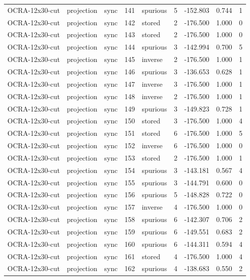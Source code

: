 \begin{tabular}{lllrlrrrr}
OCRA-12x30-cut & projection & sync & 141 & spurious & 5 & -152.803 & 0.744 & 1 \\
OCRA-12x30-cut & projection & sync & 142 & stored & 2 & -176.500 & 1.000 & 0 \\
OCRA-12x30-cut & projection & sync & 143 & stored & 2 & -176.500 & 1.000 & 0 \\
OCRA-12x30-cut & projection & sync & 144 & spurious & 3 & -142.994 & 0.700 & 5 \\
OCRA-12x30-cut & projection & sync & 145 & inverse & 2 & -176.500 & 1.000 & 1 \\
OCRA-12x30-cut & projection & sync & 146 & spurious & 3 & -136.653 & 0.628 & 1 \\
OCRA-12x30-cut & projection & sync & 147 & inverse & 3 & -176.500 & 1.000 & 1 \\
OCRA-12x30-cut & projection & sync & 148 & inverse & 2 & -176.500 & 1.000 & 1 \\
OCRA-12x30-cut & projection & sync & 149 & spurious & 3 & -149.823 & 0.728 & 1 \\
OCRA-12x30-cut & projection & sync & 150 & stored & 3 & -176.500 & 1.000 & 4 \\
OCRA-12x30-cut & projection & sync & 151 & stored & 6 & -176.500 & 1.000 & 5 \\
OCRA-12x30-cut & projection & sync & 152 & inverse & 6 & -176.500 & 1.000 & 0 \\
OCRA-12x30-cut & projection & sync & 153 & stored & 2 & -176.500 & 1.000 & 1 \\
OCRA-12x30-cut & projection & sync & 154 & spurious & 3 & -143.181 & 0.567 & 4 \\
OCRA-12x30-cut & projection & sync & 155 & spurious & 3 & -144.791 & 0.600 & 0 \\
OCRA-12x30-cut & projection & sync & 156 & spurious & 5 & -148.828 & 0.722 & 0 \\
OCRA-12x30-cut & projection & sync & 157 & inverse & 4 & -176.500 & 1.000 & 0 \\
OCRA-12x30-cut & projection & sync & 158 & spurious & 6 & -142.307 & 0.706 & 2 \\
OCRA-12x30-cut & projection & sync & 159 & spurious & 6 & -149.551 & 0.683 & 2 \\
OCRA-12x30-cut & projection & sync & 160 & spurious & 6 & -144.311 & 0.594 & 4 \\
OCRA-12x30-cut & projection & sync & 161 & stored & 4 & -176.500 & 1.000 & 4 \\
OCRA-12x30-cut & projection & sync & 162 & spurious & 4 & -138.683 & 0.550 & 2 \\

\end{tabular}
